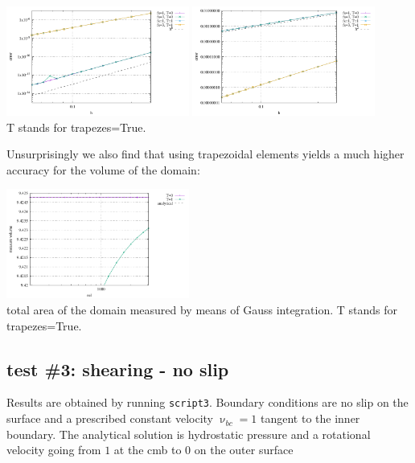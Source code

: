 \begin{center}
\includegraphics[width=6cm]{python_codes/fieldstone_151/results/test2/errv}
\includegraphics[width=6cm]{python_codes/fieldstone_151/results/test2/errp}\\
{\captionfont T stands for {\python trapezes=True}.}
\end{center}

Unsurprisingly we also find that using trapezoidal elements yields a 
much higher accuracy for the volume of the domain:
\begin{center}
\includegraphics[width=6cm]{python_codes/fieldstone_151/results/test2/areas}\\
{\captionfont total area of the domain measured by means of Gauss integration.
T stands for {\python trapezes=True}.}
\end{center}



\subsection*{test \#3: shearing - no slip}

Results are obtained by running {\tt script3}. Boundary conditions are 
no slip on the surface and a prescribed constant velocity $\upnu_{bc}=1$ tangent 
to the inner boundary.
The analytical solution is hydrostatic pressure and a rotational velocity going from 
$1$ at the cmb to 0 on the outer surface

